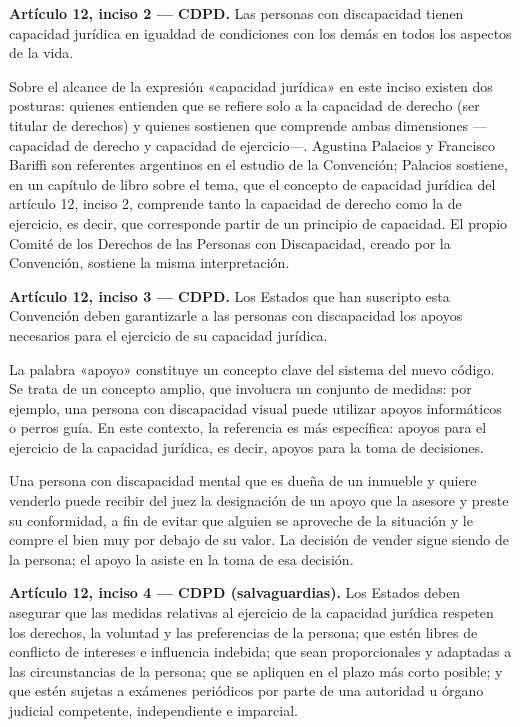 \documentclass[12pt,oneside]{book}
\begin{document}
\begin{importante}
\textbf{Artículo 12, inciso 2 --- CDPD.} Las personas con discapacidad tienen capacidad jurídica en igualdad de condiciones con los demás en todos los aspectos de la vida.
\end{importante}

Sobre el alcance de la expresión «capacidad jurídica» en este inciso existen dos posturas: quienes entienden que se refiere solo a la capacidad de derecho (ser titular de derechos) y quienes sostienen que comprende ambas dimensiones ---capacidad de derecho y capacidad de ejercicio---. Agustina Palacios y Francisco Bariffi son referentes argentinos en el estudio de la Convención; Palacios sostiene, en un capítulo de libro sobre el tema, que el concepto de capacidad jurídica del artículo 12, inciso 2, comprende tanto la capacidad de derecho como la de ejercicio, es decir, que corresponde partir de un principio de capacidad. El propio Comité de los Derechos de las Personas con Discapacidad, creado por la Convención, sostiene la misma interpretación.

\begin{importante}
\textbf{Artículo 12, inciso 3 --- CDPD.} Los Estados que han suscripto esta Convención deben garantizarle a las personas con discapacidad los apoyos necesarios para el ejercicio de su capacidad jurídica.
\end{importante}

La palabra «apoyo» constituye un concepto clave del sistema del nuevo código. Se trata de un concepto amplio, que involucra un conjunto de medidas: por ejemplo, una persona con discapacidad visual puede utilizar apoyos informáticos o perros guía. En este contexto, la referencia es más específica: apoyos para el ejercicio de la capacidad jurídica, es decir, apoyos para la toma de decisiones.

\begin{ejemplo}
Una persona con discapacidad mental que es dueña de un inmueble y quiere venderlo puede recibir del juez la designación de un apoyo que la asesore y preste su conformidad, a fin de evitar que alguien se aproveche de la situación y le compre el bien muy por debajo de su valor. La decisión de vender sigue siendo de la persona; el apoyo la asiste en la toma de esa decisión.
\end{ejemplo}

\begin{importante}
\textbf{Artículo 12, inciso 4 --- CDPD (salvaguardias).} Los Estados deben asegurar que las medidas relativas al ejercicio de la capacidad jurídica respeten los derechos, la voluntad y las preferencias de la persona; que estén libres de conflicto de intereses e influencia indebida; que sean proporcionales y adaptadas a las circunstancias de la persona; que se apliquen en el plazo más corto posible; y que estén sujetas a exámenes periódicos por parte de una autoridad u órgano judicial competente, independiente e imparcial.
\end{importante}
\end{document}
